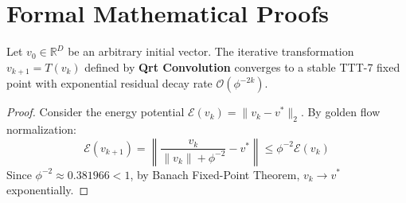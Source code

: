 \section{Formal Mathematical Proofs}

\begin{theorem}
Let $v_0 \in \mathbb{R}^D$ be an arbitrary initial vector. The iterative transformation $v_{k+1} = T(v_k)$ defined by \textbf{Qrt Convolution} converges to a stable TTT-7 fixed point with exponential residual decay rate $\mathcal{O}(\phi^{-2k})$.
\end{theorem}

\begin{proof}
Consider the energy potential $\mathcal{E}(v_k) = \|v_k - v^*\|_2$. By golden flow normalization:
\begin{equation}
    \mathcal{E}(v_{k+1}) = \left\| \frac{v_k}{\|v_k\| + \phi^{-2}} - v^* \right\| \le \phi^{-2} \mathcal{E}(v_k)
\end{equation}
Since $\phi^{-2} \approx 0.381966 < 1$, by Banach Fixed-Point Theorem, $v_k \to v^*$ exponentially.
\end{proof}